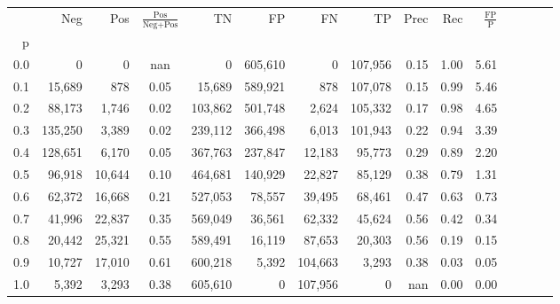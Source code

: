 \begin{tabular}{rrrcrrrrrrrrrrr}
\toprule
{} &      Neg &     Pos & $\frac{\text{Pos}}{\text{Neg}+\text{Pos}}$ &       TN &       FP &       FN &       TP &  Prec &   Rec & $\frac{\text{FP}}{\text{P}}$ \\
p   &          &         &                                            &          &          &          &          &       &       &                              \\
\midrule
0.0 &        0 &       0 &                                        nan &        0 &  605,610 &        0 &  107,956 &  0.15 &  1.00 &                         5.61 \\
0.1 &   15,689 &     878 &                                       0.05 &   15,689 &  589,921 &      878 &  107,078 &  0.15 &  0.99 &                         5.46 \\
0.2 &   88,173 &   1,746 &                                       0.02 &  103,862 &  501,748 &    2,624 &  105,332 &  0.17 &  0.98 &                         4.65 \\
0.3 &  135,250 &   3,389 &                                       0.02 &  239,112 &  366,498 &    6,013 &  101,943 &  0.22 &  0.94 &                         3.39 \\
0.4 &  128,651 &   6,170 &                                       0.05 &  367,763 &  237,847 &   12,183 &   95,773 &  0.29 &  0.89 &                         2.20 \\
0.5 &   96,918 &  10,644 &                                       0.10 &  464,681 &  140,929 &   22,827 &   85,129 &  0.38 &  0.79 &                         1.31 \\
0.6 &   62,372 &  16,668 &                                       0.21 &  527,053 &   78,557 &   39,495 &   68,461 &  0.47 &  0.63 &                         0.73 \\
0.7 &   41,996 &  22,837 &                                       0.35 &  569,049 &   36,561 &   62,332 &   45,624 &  0.56 &  0.42 &                         0.34 \\
0.8 &   20,442 &  25,321 &                                       0.55 &  589,491 &   16,119 &   87,653 &   20,303 &  0.56 &  0.19 &                         0.15 \\
0.9 &   10,727 &  17,010 &                                       0.61 &  600,218 &    5,392 &  104,663 &    3,293 &  0.38 &  0.03 &                         0.05 \\
1.0 &    5,392 &   3,293 &                                       0.38 &  605,610 &        0 &  107,956 &        0 &   nan &  0.00 &                         0.00 \\
\bottomrule
\end{tabular}
